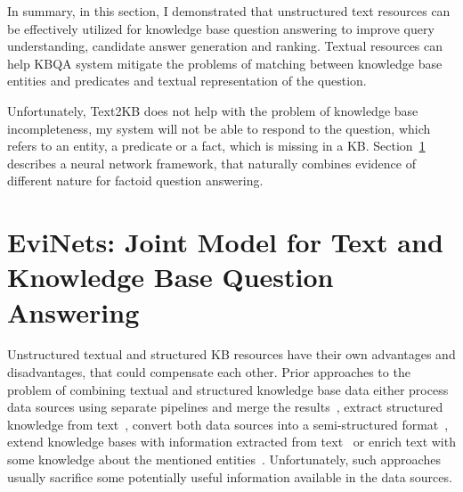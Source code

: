 
In summary, in this section, I demonstrated that unstructured text resources can be effectively utilized for knowledge base question answering to improve query understanding, candidate answer generation and ranking.
Textual resources can help KBQA system mitigate the problems of matching between knowledge base entities and predicates and textual representation of the question.

Unfortunately, Text2KB does not help with the problem of knowledge base incompleteness, \ie my system will not be able to respond to the question, which refers to an entity, a predicate or a fact, which is missing in a KB.
Section~\ref{section:factoid:evinets} describes a neural network framework, that naturally combines evidence of different nature for factoid question answering.



\section{EviNets: Joint Model for Text and Knowledge Base Question Answering}
\label{section:factoid:evinets}

Unstructured textual and structured KB resources have their own advantages and disadvantages, that could compensate each other.
Prior approaches to the problem of combining textual and structured knowledge base data either process data sources using separate pipelines and merge the results~\cite{baudivs2015yodaqa,ferrucci2010building}, extract structured knowledge from text~\cite{Agichtein:2000:SER:336597.336644,Dong:2014:KVW:2623330.2623623,MintzBSJ09}, convert both data sources into a semi-structured format~\cite{Fader:2014:OQA:2623330.2623677}, extend knowledge bases with information extracted from text~\cite{elbassuoni2009language,yahya2016question} or 
enrich text with some knowledge about the mentioned entities~\cite{Sun:2015:ODQ:2736277.2741651}.
Unfortunately, such approaches usually sacrifice some potentially useful information available in the data sources.

